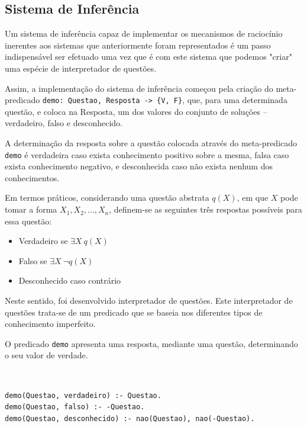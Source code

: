 \documentclass[a4paper, 11pt]{article}
\begin{document}
\pagebreak



\pagebreak

\subsection{Sistema de Inferência}

Um sistema de inferência capaz de implementar os mecanismos de raciocínio
inerentes aos sistemas que anteriormente foram representados é um passo indispensável ser 
efetuado uma vez que é com este sistema que podemos "criar" uma
espécie de interpretador de questões.

Assim, a implementação do sistema de inferência começou pela criação do meta-predicado 
\texttt{demo: Questao, Resposta -> \{V, F\}}, que, para uma determinada questão, e coloca na
Resposta, um dos valores do conjunto de soluções --  verdadeiro, falso e desconhecido. 

A determinação da resposta sobre a questão colocada através do meta-predicado \texttt{demo} é 
verdadeira 
caso exista conhecimento positivo sobre a mesma, falsa caso exista conhecimento negativo, e
desconhecida caso não exista nenhum dos conhecimentos.

Em termos práticos, considerando uma questão abstrata $q(X)$, em que $X$ pode tomar a forma $X_1, 
X_2, ..., X_n$, definem-se as seguintes três respostas
possíveis para essa questão:

\begin{itemize}
    \item Verdadeiro se $\exists X \ q(X)$
    \item Falso se $\exists X \ \neg q(X)$
    \item Desconhecido caso contrário
\end{itemize}

Neste sentido, foi desenvolvido interpretador
de questões. Este interpretador de questões trata-se de um predicado que se
baseia nos diferentes tipos de conhecimento imperfeito.

O predicado \texttt{demo} apresenta uma resposta, mediante uma questão, determinando o seu valor 
de verdade.

\

\begin{lstlisting}[caption={Extensão do meta-predicado \texttt{demo}}, label={lst:demo}]
% Extensao do meta-predicado demo: Questao, Resposta -> {V, F, D}
demo(Questao, verdadeiro) :- Questao.
demo(Questao, falso) :- -Questao.
demo(Questao, desconhecido) :- nao(Questao), nao(-Questao).
\end{lstlisting}
\end{document}
